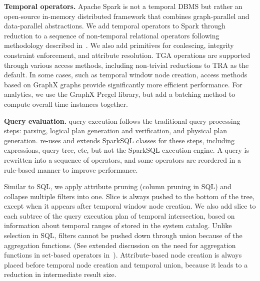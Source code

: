 {\bf Temporal operators.}  Apache Spark is not a temporal DBMS but
rather an open-source in-memory distributed framework that combines
graph-parallel and data-parallel abstractions.  We add temporal
operators to Spark through reduction to a sequence of non-temporal
relational operators following methodology described
in~\cite{Dignos2012}.  We also add primitives for coalescing,
integrity constraint enforcement, and attribute resolution.  TGA
operations are supported through various access methods, including
non-trivial reductions to TRA as the default.  In some cases, such as
temporal window node creation, access methods based on GraphX graphs
provide significantly more efficient performance.  For analytics, we
use the GraphX Pregel library, but add a batching method to compute
overall time instances together. 

{\bf Query evaluation.}  \sys query execution follows the traditional
query processing steps: parsing, logical plan generation and
verification, and physical plan generation. \sys re-uses and extends
SparkSQL classes for these steps, including expressions, query tree,
etc, but not the SparkSQL execution engine.  A \ql query is rewritten
into a sequence of \tga operators, and some operators are reordered in
a rule-based manner to improve performance.

Similar to SQL, we apply attribute pruning (column pruning in SQL) and
collapse multiple filters into one.  Slice is always pushed to the
bottom of the tree, except when it appears after temporal window node
creation.  We also add slice to each subtree of the query execution
plan of temporal intersection, based on information about temporal
ranges of \tgs stored in the system catalog.  Unlike selection in SQL, filters
cannot be pushed down through union because of the aggregation
functions.  (See extended discussion on the need for aggregation
functions in set-based operators in~\cite{PortalarXiv2016}).
Attribute-based node creation is always placed before temporal node
creation and temporal union, because it leads to a reduction in
intermediate result size.

